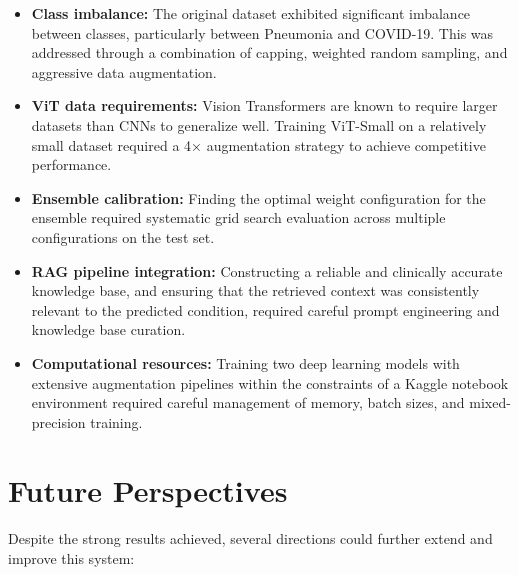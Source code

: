 \documentclass[12pt]{report}
\begin{document}
\begin{itemize}
    \item \textbf{Class imbalance:} The original dataset exhibited
    significant imbalance between classes, particularly between Pneumonia
    and COVID-19. This was addressed through a combination of capping,
    weighted random sampling, and aggressive data augmentation.

    \item \textbf{ViT data requirements:} Vision Transformers are known
    to require larger datasets than CNNs to generalize well. Training
    ViT-Small on a relatively small dataset required a 4× augmentation
    strategy to achieve competitive performance.

    \item \textbf{Ensemble calibration:} Finding the optimal weight
    configuration for the ensemble required systematic grid search
    evaluation across multiple configurations on the test set.

    \item \textbf{RAG pipeline integration:} Constructing a reliable
    and clinically accurate knowledge base, and ensuring that the
    retrieved context was consistently relevant to the predicted
    condition, required careful prompt engineering and knowledge base
    curation.

    \item \textbf{Computational resources:} Training two deep learning
    models with extensive augmentation pipelines within the constraints
    of a Kaggle notebook environment required careful management of
    memory, batch sizes, and mixed-precision training.
\end{itemize}

\section*{Future Perspectives}

Despite the strong results achieved, several directions could further
extend and improve this system:
\end{document}
